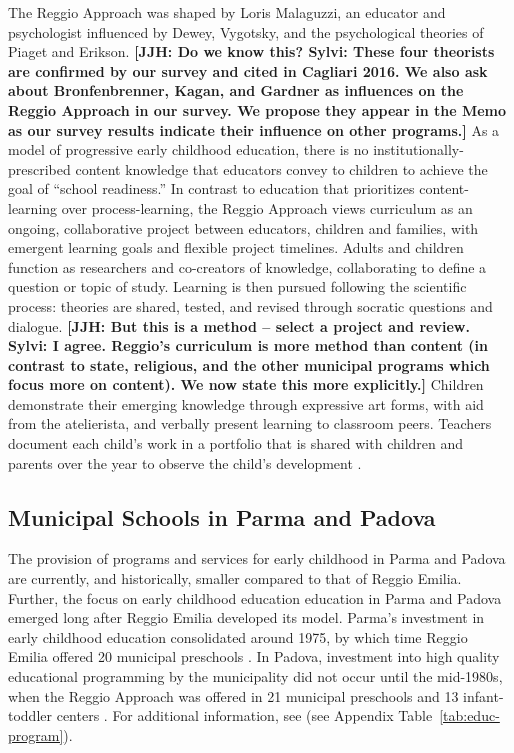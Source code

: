 The Reggio Approach was shaped by Loris Malaguzzi, an educator and psychologist influenced by Dewey, Vygotsky, and the psychological theories of Piaget and Erikson. \textbf{[JJH: Do we know this? Sylvi: These four theorists are confirmed by our survey and cited in Cagliari 2016. We also ask about Bronfenbrenner, Kagan, and Gardner as influences on the Reggio Approach in our survey. We propose they appear in the Memo as our survey results indicate their influence on other programs.]} As a model of progressive early childhood education, there is no institutionally-prescribed content knowledge that educators convey to children to achieve the goal of ``school readiness.'' In contrast to education that prioritizes content-learning over process-learning, the Reggio Approach views curriculum as an ongoing, collaborative project between educators, children and families, with emergent learning goals and flexible project timelines. Adults and children function as researchers and co-creators of knowledge, collaborating to define a question or topic of study. Learning is then pursued following the scientific process: theories are shared, tested, and revised through socratic questions and dialogue. \textbf{[JJH: But this is a method -- select a project and review. Sylvi: I agree. Reggio's curriculum is more method than content (in contrast to state, religious, and the other municipal programs which focus more on content). We now state this more explicitly.]} Children demonstrate their emerging knowledge through expressive art forms, with aid from the atelierista, and verbally present learning to classroom peers. Teachers document each child's work in a portfolio that is shared with children and parents over the year to observe the child's development \citep{Rinaldi_2006_ReggioEmilia_BOOK,Giudici-Nicolosi_2014_Reggio-Approach}. 

\subsection{Municipal Schools in Parma and Padova}

The provision of programs and services for early childhood in Parma and Padova are currently, and historically, smaller compared to that of Reggio Emilia. Further, the focus on early childhood education education in Parma and Padova emerged long after Reggio Emilia developed its model. Parma's investment in early childhood education consolidated around 1975, by which time Reggio Emilia offered 20 municipal preschools \citep{Giudici-Nicolosi_2014_Reggio-Approach}. In Padova, investment into high quality educational programming by the municipality did not occur until the mid-1980s, when the Reggio Approach was offered in 21 municipal preschools and 13 infant-toddler centers \citep{Giudici-Nicolosi_2014_Reggio-Approach}. For additional information, see (see Appendix Table~\ref{tab:educ-program}). 

